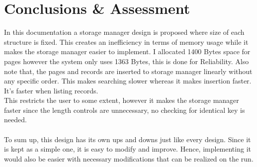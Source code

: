 \documentclass[12pt,a4paper]{article}
\begin{document}
\section{Conclusions \& Assessment}
    In this documentation a storage manager design is proposed where size of each
structure is fixed. This creates an inefficiency in terms of memory usage while
it makes the storage manager easier to implement. I allocated 1400 Bytes space for pages however the system only uses 1363 Bytes, this is done for Reliability.  Also note that, the pages
and records are inserted to storage manager linearly without any specific order. This makes searching slower whereas it makes
insertion faster. It's faster when listing records. \\
    This restricts the user to some extent, however it makes the storage manager
faster since the length controls are unnecessary, no checking for identical key is
needed. \\
    \\
    To sum up, this design has its own ups and downs just like every design.
Since it is kept as a simple one, it is easy to modify and improve. Hence,
implementing it would also be easier with necessary modifications that can be
realized on the run.
\end{document}

